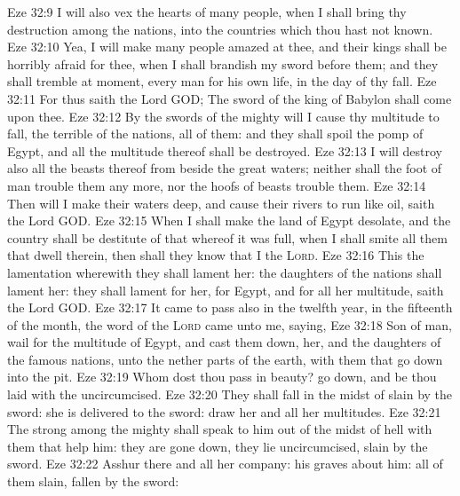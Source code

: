 \vs Eze 32:9 I will also vex the hearts of many people, when I shall bring thy destruction among the nations, into the countries which thou hast not known.
\vs Eze 32:10 Yea, I will make many people amazed at thee, and their kings shall be horribly afraid for thee, when I shall brandish my sword before them; and they shall tremble at  moment, every man for his own life, in the day of thy fall.
\vs Eze 32:11 For thus saith the Lord GOD; The sword of the king of Babylon shall come upon thee.
\vs Eze 32:12 By the swords of the mighty will I cause thy multitude to fall, the terrible of the nations, all of them: and they shall spoil the pomp of Egypt, and all the multitude thereof shall be destroyed.
\vs Eze 32:13 I will destroy also all the beasts thereof from beside the great waters; neither shall the foot of man trouble them any more, nor the hoofs of beasts trouble them.
\vs Eze 32:14 Then will I make their waters deep, and cause their rivers to run like oil, saith the Lord GOD.
\vs Eze 32:15 When I shall make the land of Egypt desolate, and the country shall be destitute of that whereof it was full, when I shall smite all them that dwell therein, then shall they know that I  the \textsc{Lord}.
\vs Eze 32:16 This  the lamentation wherewith they shall lament her: the daughters of the nations shall lament her: they shall lament for her,  for Egypt, and for all her multitude, saith the Lord GOD.
\vs Eze 32:17 It came to pass also in the twelfth year, in the fifteenth  of the month,  the word of the \textsc{Lord} came unto me, saying,
\vs Eze 32:18 Son of man, wail for the multitude of Egypt, and cast them down,  her, and the daughters of the famous nations, unto the nether parts of the earth, with them that go down into the pit.
\vs Eze 32:19 Whom dost thou pass in beauty? go down, and be thou laid with the uncircumcised.
\vs Eze 32:20 They shall fall in the midst of  slain by the sword: she is delivered to the sword: draw her and all her multitudes.
\vs Eze 32:21 The strong among the mighty shall speak to him out of the midst of hell with them that help him: they are gone down, they lie uncircumcised, slain by the sword.
\vs Eze 32:22 Asshur  there and all her company: his graves  about him: all of them slain, fallen by the sword:

